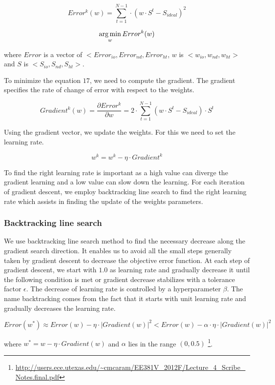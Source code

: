 \begin{equation}
Error^k(w) = \sum_{t=1}^{N-1} \cdot (w \cdot S^t - S_{ideal}) ^ 2
\end{equation}

\begin{equation}
\operatorname*{arg\,min}_w Error^k(w) 
\end{equation} 

where $Error$ is a vector of $<Error_{io}, Error_{nd}, Error_{ht}$,
$w$ is $<w_{io}, w_{nd}, w_{ht}>$ and $S$ is $<S_{io}, S_{nd}, S_{ht}>$.

To minimize the equation $17$, we need to compute the gradient. The gradient specifies the rate of change of error with respect to the weights.

\begin{equation}
Gradient^k(w) = \frac{\partial Error^k}{\partial w} = 2 \cdot \sum_{t=1}^{N-1} (w \cdot S^t - S_{ideal}) \cdot S^t
\end{equation}

Using the gradient vector, we update the weights. For this we need to set the learning rate.

\begin{equation}
w^k = w^k - \eta \cdot {Gradient^k}
\end{equation}

To find the right learning rate is important as a high value can diverge the gradient learning and a low value can slow down the learning. For each iteration of gradient descent, we employ backtracking line search to find the right learning rate which assists in finding the update of the weights parameters.

\subsubsection{Backtracking line search}
We use backtracking line search method to find the necessary decrease along the gradient search direction. It enables us to avoid all the small steps generally taken by gradient descent to decrease the objective error function. At each step of gradient descent, we start with $1.0$ as learning rate and gradually decrease it until the following condition is met or gradient decrease stabilizes with a tolerance factor $\epsilon$. The decrease of learning rate is controlled by a hyperparameter $\beta$. The name backtracking comes from the fact that it starts with unit learning rate and gradually decreases the learning rate.

\begin{equation}
Error(w^*) \approx Error(w) - \eta \cdot |Gradient(w)| ^ 2 < Error(w) - \alpha \cdot \eta \cdot |Gradient(w)| ^ 2
\end{equation}

where $w^* = w - \eta \cdot Gradient(w)$ and $\alpha$ lies in the range $\left(0, 0.5\right)$ \footnote{\url{http://users.ece.utexas.edu/~cmcaram/EE381V_2012F/Lecture_4_Scribe_Notes.final.pdf}}.

